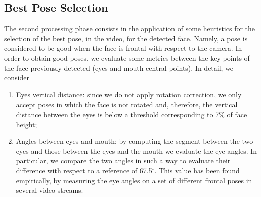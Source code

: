 \documentclass[10pt,a4paper]{report}
\begin{document}
\subsection*{Best Pose Selection}
The second processing phase consists in the application of some heuristics for the selection of the best pose, in the video, for the detected face. Namely, a pose is considered to be good when the face is frontal with respect to the camera. In order to obtain good poses, we evaluate some metrics between the key points of the face previously detected (eyes and mouth central points). In detail, we consider
\begin{enumerate}
\item Eyes vertical distance: since we do not apply rotation correction, we only accept poses in which the face is not rotated and, therefore, the vertical distance between the eyes is below a threshold corresponding to 7\% of face height;
\item Angles between eyes and mouth: by computing the segment between the two eyes and those between the eyes and the mouth we evaluate the eye angles. In particular, we compare the two angles in such a way to evaluate their difference with respect to a reference of 67.5$^\circ$. This value has been found empirically, by measuring the eye angles on a set of different frontal poses in several video streams.
\end{enumerate}
\end{document}
